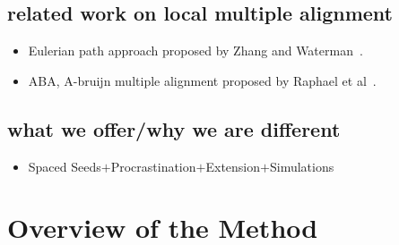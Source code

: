 \documentclass{llncs}
\begin{document}
\subsection{related work on local multiple alignment}
\begin{itemize}

\item Eulerian path approach proposed by Zhang and Waterman~\cite{ref-related1}.

\item ABA, A-bruijn multiple alignment proposed by Raphael et al~\cite{ref-aba}.



\end{itemize}
\subsection{what we offer/why we are different}
\begin{itemize}

\item Spaced Seeds$+$Procrastination$+$Extension$+$Simulations

\end{itemize}
\section{Overview of the Method}\label{sec:overview}
\end{document}
